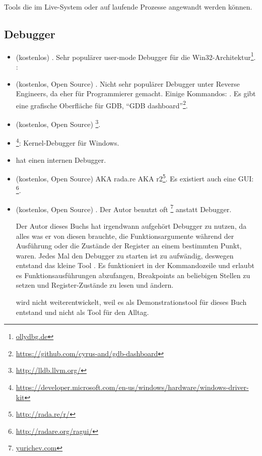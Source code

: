 
Tools die im Live-System oder auf laufende Prozesse angewandt werden können.

\subsection{Debugger}

\myindex{\olly}

\begin{itemize}
\item (kostenlos) .
Sehr populärer user-mode Debugger für die Win32-Architektur\footnote{\href{http://go.yurichev.com/17032}{ollydbg.de}}.
\ShortHotKeyCheatsheet: 

\item (kostenlos, Open Source) .
Nicht sehr populärer Debugger unter Reverse Engineers, da eher für Programmierer gemacht.
Einige Kommandos: .
Es gibt eine grafische Oberfläche für GDB, ``GDB dashboard''\footnote{\url{https://github.com/cyrus-and/gdb-dashboard}}.

\item (kostenlos, Open Source) \footnote{\url{http://lldb.llvm.org/}}.

\item {}\footnote{\url{https://developer.microsoft.com/en-us/windows/hardware/windows-driver-kit}}:
Kernel-Debugger für Windows.

\item {} hat einen internen Debugger.

\item (kostenlos, Open Source)  \ac{AKA} rada.re \ac{AKA} r2\footnote{\url{http://rada.re/r/}}.
Es existiert auch eine GUI: \footnote{\url{http://radare.org/ragui/}}.

\item (kostenlos, Open Source) .
\label{tracer}
Der Autor benutzt oft 
\footnote{\href{http://go.yurichev.com/17338}{yurichev.com}}
anstatt Debugger.

Der Autor dieses Buchs hat irgendwann aufgehört Debugger zu nutzen, da alles was er von diesen
brauchte, die Funktionsargumente während der Ausführung oder die Zustände der Register an einem
bestimmten Punkt, waren.
Jedes Mal den Debugger zu starten ist zu aufwändig, deswegen entstand das kleine Tool .
Es funktioniert in der Kommandozeile und erlaubt es Funktionsausführungen abzufangen,
Breakpoints an beliebigen Stellen zu setzen und Register-Zustände zu lesen und ändern.

 wird nicht weiterentwickelt, weil es als Demonstrationstool für dieses Buch entstand
und nicht als Tool für den Alltag.
\end{itemize}

